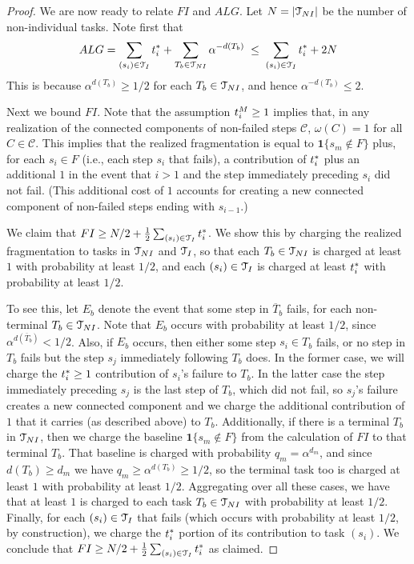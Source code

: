 \begin{proof}
    \medskip

    We are now ready to relate $FI$ and $ALG$.
    Let $N = |\mathcal{T}_{NI}|$ be the number of non-individual tasks.
    Note first that
    \[ 
    ALG 
    = 
    \sum_{(s_i) \in \mathcal{T}_I} t^*_{i} 
    + 
    \sum_{T_b \in \mathcal{T}_{NI}} \alpha^{-d(T_b)} 
    \;\leq\;
    \sum_{(s_i) \in \mathcal{T}_I} t^*_{i}
    +
    2N 
    \]
    This is because $\alpha^{d(T_b)} \geq 1/2$ for each $T_b \in \mathcal{T}_{NI}$, and hence $\alpha^{-d(T_b)} \leq 2$.

    \medskip

    Next we bound $FI$.
    Note that the assumption $t^{M}_{i} \geq 1$ implies that, in any realization of the connected components of non-failed steps $\mathcal{C}$, $\omega(C) = 1$ for all $C \in \mathcal{C}$.
    This implies that the realized fragmentation is equal to $\mathbf{1}\{s_m \notin F\}$ plus, for each $s_i \in F$ (i.e., each step $s_i$ that fails), a contribution of $t^*_{i}$ plus an additional $1$ in the event that $i > 1$ and the step immediately preceding $s_i$ did not fail.
    (This additional cost of $1$ accounts for creating a new connected component of non-failed steps ending with $s_{i-1}$.)

    We claim that $FI \geq N/2 + \frac{1}{2}\sum_{(s_i) \in \mathcal{T}_I} t^*_{i}$.
    We show this by charging the realized fragmentation to tasks in $\mathcal{T}_{NI}$ and $\mathcal{T}_I$, so that each $T_b \in \mathcal{T}_{NI}$ is charged at least $1$ with probability at least $1/2$, and each $(s_i) \in \mathcal{T}_I$ is charged at least $t^*_{i}$ with probability at least $1/2$.

    To see this, let $E_b$ denote the event that some step in $\overline{T}_b$ fails, for each non-terminal $T_b \in \mathcal{T}_{NI}$.
    Note that $E_b$ occurs with probability at least $1/2$, since $\alpha^{d(\overline{T}_b)} < 1/2$.
    Also, if $E_b$ occurs, then either some step $s_i \in T_b$ fails, or no step in $T_b$ fails but the step $s_j$ immediately following $T_b$ does.
    In the former case, we will charge the $t^*_{i} \geq 1$ contribution of $s_i$'s failure to $T_b$.
    In the latter case the step immediately preceding $s_j$ is the last step of $T_b$, which did not fail, so $s_j$'s failure creates a new connected component and we charge the additional contribution of $1$ that it carries (as described above) to $T_b$.
    Additionally, if there is a terminal $T_b$ in $\mathcal{T}_{NI}$, then we charge the baseline $\mathbf{1}\{s_m \notin F\}$ from the calculation of $FI$ to that terminal $T_b$.
    That baseline is charged with probability $q_m = \alpha^{d_m}$, and since $d(T_b) \geq d_m$ we have $q_m \geq \alpha^{d(T_b)} \geq 1/2$, so the terminal task too is charged at least $1$ with probability at least $1/2$.
    Aggregating over all these cases, we have that at least $1$ is charged to each task $T_b \in \mathcal{T}_{NI}$ with probability at least $1/2$.
    Finally, for each $(s_i) \in \mathcal{T}_I$ that fails (which occurs with probability at least $1/2$, by construction), we charge the $t^*_{i}$ portion of its contribution to task $(s_i)$.
    We conclude that $FI \geq N/2 + \frac{1}{2}\sum_{(s_i) \in \mathcal{T}_I}t^*_{i}$ as claimed.


\end{proof}
